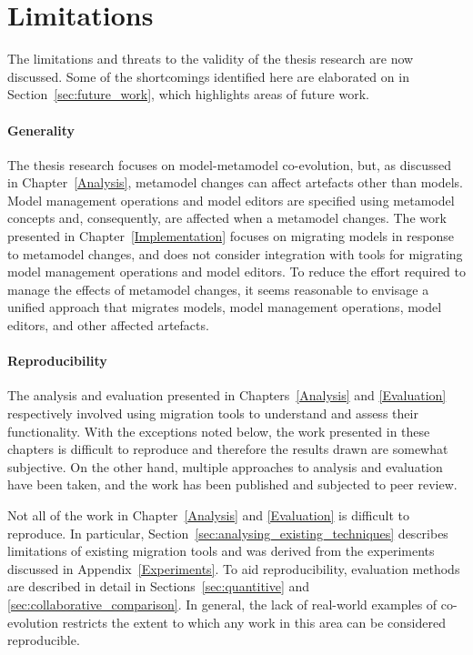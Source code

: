 
\section{Limitations}
\label{sec:limitations}
The limitations and threats to the validity of the thesis research are now discussed. Some of the shortcomings identified here are elaborated on in Section~\ref{sec:future_work}, which highlights areas of future work.

\paragraph{Generality} The thesis research focuses on model-metamodel co-evolution, but, as discussed in Chapter~\ref{Analysis}, metamodel changes can affect artefacts other than models. Model management operations and model editors are specified using metamodel concepts and, consequently, are affected when a metamodel changes. The work presented in Chapter~\ref{Implementation} focuses on migrating models in response to metamodel changes, and does not consider integration with tools for migrating model management operations and model editors. To reduce the effort required to manage the effects of metamodel changes, it seems reasonable to envisage a unified approach that migrates models, model management operations, model editors, and other affected artefacts.

\paragraph{Reproducibility} The analysis and evaluation presented in Chapters~\ref{Analysis} and \ref{Evaluation} respectively involved using migration tools to understand and assess their functionality. With the exceptions noted below, the work presented in these chapters is difficult to reproduce and therefore the results drawn are somewhat subjective. On the other hand, multiple approaches to analysis and evaluation have been taken, and the work has been published and subjected to peer review. 

Not all of the work in Chapter~\ref{Analysis} and \ref{Evaluation} is difficult to reproduce. In particular, Section~\ref{sec:analysing_existing_techniques} describes limitations of existing migration tools and was derived from the experiments discussed in Appendix~\ref{Experiments}. To aid reproducibility, evaluation methods are described in detail in Sections~\ref{sec:quantitive} and \ref{sec:collaborative_comparison}. In general, the lack of real-world examples of co-evolution restricts the extent to which any work in this area can be considered reproducible. 

